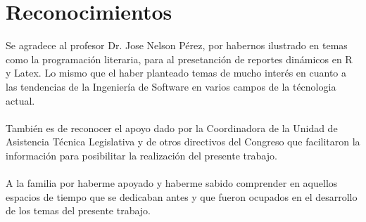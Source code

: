 \documentclass[conference]{IEEEtran}
\begin{document}
	
		


\section*{Reconocimientos}

	Se agradece al profesor Dr. Jose Nelson Pérez, por habernos ilustrado en temas como la programación literaria, para al presetanción de reportes dinámicos en R y Latex. Lo mismo que el haber planteado temas de mucho interés en cuanto a las tendencias de la Ingeniería de Software en varios campos de la técnologia actual. \\ \\
	También es de reconocer el apoyo dado por la Coordinadora de la Unidad de Asistencia Técnica Legislativa y de otros directivos del Congreso que facilitaron la información para posibilitar la realización del presente trabajo.\\  \\
	A la familia por haberme apoyado y haberme sabido comprender en aquellos espacios de tiempo que se dedicaban antes y que fueron ocupados en el desarrollo de los temas del presente trabajo.


\end{document}
